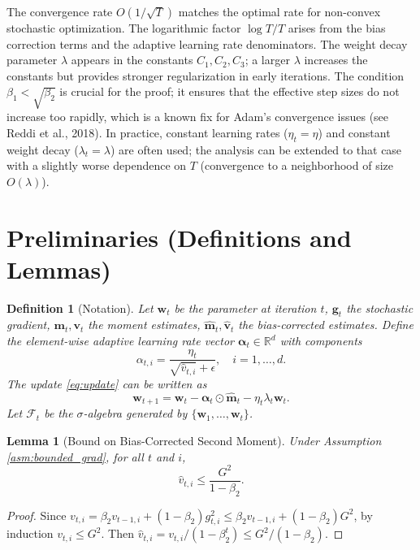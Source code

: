 \documentclass{article}
\theoremstyle{plain}
\newtheorem{lemma}{Lemma}
\newtheorem{definition}{Definition}
\theoremstyle{definition}
\renewcommand{\vec}[1]{\boldsymbol{#1}}
\newcommand{\R}{\mathbb{R}}
\begin{document}
The convergence rate $O(1/\sqrt{T})$ matches the optimal rate for non-convex stochastic optimization. The logarithmic factor $\log T / T$ arises from the bias correction terms and the adaptive learning rate denominators. The weight decay parameter $\lambda$ appears in the constants $C_1, C_2, C_3$; a larger $\lambda$ increases the constants but provides stronger regularization in early iterations. The condition $\beta_1 < \sqrt{\beta_2}$ is crucial for the proof; it ensures that the effective step sizes do not increase too rapidly, which is a known fix for Adam's convergence issues (see Reddi et al., 2018). In practice, constant learning rates ($\eta_t = \eta$) and constant weight decay ($\lambda_t = \lambda$) are often used; the analysis can be extended to that case with a slightly worse dependence on $T$ (convergence to a neighborhood of size $O(\lambda)$).

\section*{Preliminaries (Definitions and Lemmas)}

\begin{definition}[Notation]
Let $\vec{w}_t$ be the parameter at iteration $t$, $\vec{g}_t$ the stochastic gradient, $\vec{m}_t, \vec{v}_t$ the moment estimates, $\hat{\vec{m}}_t, \hat{\vec{v}}_t$ the bias-corrected estimates. Define the element-wise adaptive learning rate vector $\vec{\alpha}_t \in \R^d$ with components
\begin{equation}
    \alpha_{t,i} = \frac{\eta_t}{\sqrt{\hat{v}_{t,i}} + \epsilon}, \quad i = 1,\dots,d.
\end{equation}
The update \eqref{eq:update} can be written as
\begin{equation}
    \vec{w}_{t+1} = \vec{w}_t - \vec{\alpha}_t \odot \hat{\vec{m}}_t - \eta_t \lambda_t \vec{w}_t.
\end{equation}
Let $\mathcal{F}_t$ be the $\sigma$-algebra generated by $\{\vec{w}_1, \dots, \vec{w}_t\}$.
\end{definition}

\begin{lemma}[Bound on Bias-Corrected Second Moment] \label{lem:v_hat_bound}
Under Assumption \ref{asm:bounded_grad}, for all $t$ and $i$,
\begin{equation}
    \hat{v}_{t,i} \le \frac{G^2}{1 - \beta_2}.
\end{equation}
\end{lemma}
\begin{proof}
Since $v_{t,i} = \beta_2 v_{t-1,i} + (1-\beta_2) g_{t,i}^2 \le \beta_2 v_{t-1,i} + (1-\beta_2) G^2$, by induction $v_{t,i} \le G^2$. Then $\hat{v}_{t,i} = v_{t,i} / (1-\beta_2^t) \le G^2 / (1-\beta_2)$.
\end{proof}
\end{document}
